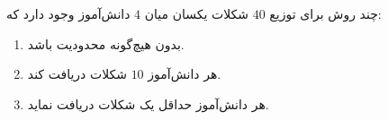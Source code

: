 \EXERCISE
چند روش برای توزیع
$40$
شکلات یکسان میان
$4$
دانش‌آموز وجود دارد که:
\begin{enumerate}
\item
بدون هیچ‌گونه محدودیت باشد.
\item
هر دانش‌آموز
$10$
شکلات دریافت کند.
\item
هر دانش‌آموز حداقل یک شکلات دریافت نماید.
\end{enumerate}